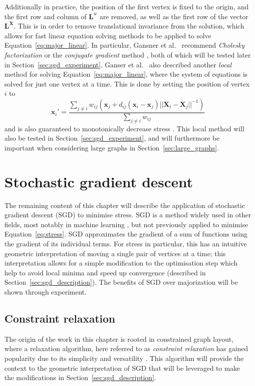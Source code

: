 Additionally in practice, the position of the first vertex is fixed to the origin, and the first row and column of $\mathbf{L}^w$ are removed, as well as the first row of the vector $\mathbf{L^X}$. This is in order to remove translational invariance from the solution, which allows for fast linear equation solving methods to be applied to solve Equation~\ref{eq:major_linear}.
In particular, Gansner et al.\ \cite{Gansner2004} recommend \emph{Cholesky factorization} \cite{Press2007Cholesky} or the \emph{conjugate gradient} method \cite{Press2007Conjugate}, both of which will be tested later in Section~\ref{sec:sgd_experiment}. 
Ganser et al.\ \cite{Gansner2004} also described another \emph{local} method for solving Equation~\ref{eq:major_linear}, where the system of equations is solved for just one vertex at a time. This is done by setting the position of vertex $i$ to
\begin{equation}
  \mathbf{x}_i' = \frac{\sum_{j\neq i}w_{ij}(\mathbf{x}_j + d_{ij}(\mathbf{x}_i - \mathbf{x}_j)||\mathbf{X}_i - \mathbf{X}_j||^{-1})}{\sum_{j\neq i}w_{ij}}
  \label{eq:major_local}
\end{equation}
and is also guaranteed to monotonically decrease stress \cite{Gansner2004}. This local method will also be tested in Section~\ref{sec:sgd_experiment}, and will furthermore be important when considering large graphs in Section~\ref{sec:large_graphs}.

\section{Stochastic gradient descent}
\label{sec:sgd}
The remaining content of this chapter will describe the application of stochastic gradient descent (SGD) to minimise stress. SGD is a method widely used in other fields, most notably in machine learning \cite{Bottou2012}, but not previously applied to minimise Equation~\ref{eq:stress}. 
SGD approximates the gradient of a sum of functions using the gradient of its individual terms. For stress in particular, this has an intuitive geometric interpretation of moving a single pair of vertices at a time; this interpretation allows for a simple modification to the optimisation step which help to avoid local minima and speed up convergence (described in Section~\ref{sec:sgd_description}). The benefits of SGD over majorization will be shown through experiment.

\subsection{Constraint relaxation}
\label{sec:wcr_story}
The origin of the work in this chapter is rooted in constrained graph layout, where a relaxation algorithm, here referred to as \emph{constraint relaxation} has gained popularity due to its simplicity and versatility \cite{Dwyer2009,Bostock2011}. This algorithm will provide the context to the geometric interpretation of SGD that will be leveraged to make the modifications in Section~\ref{sec:sgd_description}.

